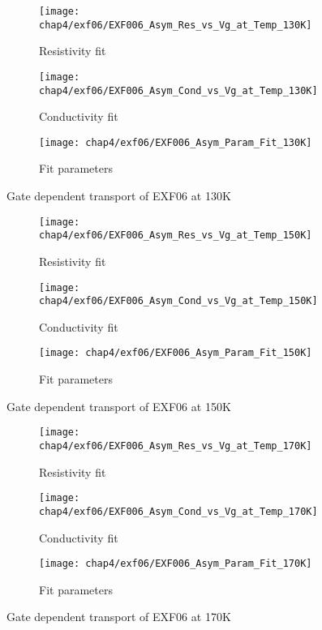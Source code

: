 \documentclass[../Matt_Gebert_Honours_Thesis.tex]{subfiles}
\begin{document}
	\begin{figure}[H]
		\centering
		\begin{subfigure}{0.4\textwidth}
			\centering
			\texttt{[image: chap4/exf06/EXF006\_Asym\_Res\_vs\_Vg\_at\_Temp\_130K]}
			\caption{Resistivity fit}
		\end{subfigure}
		\begin{subfigure}{0.4\textwidth}
			\centering
			\texttt{[image: chap4/exf06/EXF006\_Asym\_Cond\_vs\_Vg\_at\_Temp\_130K]}
			\caption{Conductivity fit}
		\end{subfigure}
		\begin{subfigure}{0.16\textwidth}
			\centering
			\texttt{[image: chap4/exf06/EXF006\_Asym\_Param\_Fit\_130K]}
			\caption{Fit parameters}
		\end{subfigure}
		\caption*{Gate dependent transport of EXF06 at 130K}
	\end{figure}
	\begin{figure}[H]
		\centering
		\begin{subfigure}{0.4\textwidth}
			\centering
			\texttt{[image: chap4/exf06/EXF006\_Asym\_Res\_vs\_Vg\_at\_Temp\_150K]}
			\caption{Resistivity fit}
		\end{subfigure}
		\begin{subfigure}{0.4\textwidth}
			\centering
			\texttt{[image: chap4/exf06/EXF006\_Asym\_Cond\_vs\_Vg\_at\_Temp\_150K]}
			\caption{Conductivity fit}
		\end{subfigure}
		\begin{subfigure}{0.16\textwidth}
			\centering
			\texttt{[image: chap4/exf06/EXF006\_Asym\_Param\_Fit\_150K]}
			\caption{Fit parameters}
		\end{subfigure}
		\caption*{Gate dependent transport of EXF06 at 150K}
	\end{figure}
	\begin{figure}[H]
		\centering
		\begin{subfigure}{0.4\textwidth}
			\centering
			\texttt{[image: chap4/exf06/EXF006\_Asym\_Res\_vs\_Vg\_at\_Temp\_170K]}
			\caption{Resistivity fit}
		\end{subfigure}
		\begin{subfigure}{0.4\textwidth}
			\centering
			\texttt{[image: chap4/exf06/EXF006\_Asym\_Cond\_vs\_Vg\_at\_Temp\_170K]}
			\caption{Conductivity fit}
		\end{subfigure}
		\begin{subfigure}{0.16\textwidth}
			\centering
			\texttt{[image: chap4/exf06/EXF006\_Asym\_Param\_Fit\_170K]}
			\caption{Fit parameters}
		\end{subfigure}
		\caption*{Gate dependent transport of EXF06 at 170K}
	\end{figure}
\end{document}

